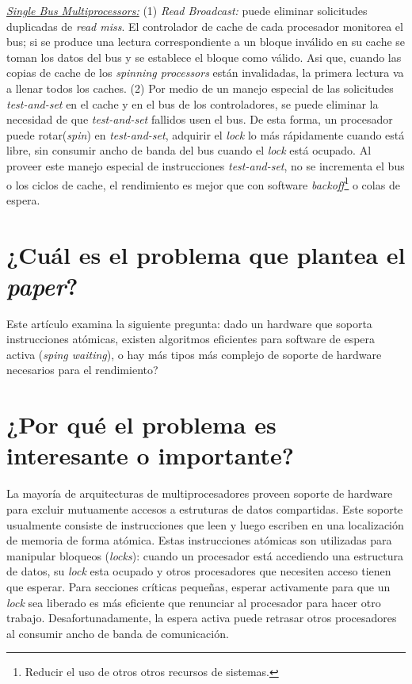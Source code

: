 \underline{\textit{Single Bus Multiprocessors:}} (1) \textit{Read Broadcast:} puede eliminar solicitudes duplicadas de \textit{read miss}. El controlador de cache de cada procesador monitorea el bus; si se produce una lectura correspondiente a un bloque inválido en su cache se toman los datos del bus y se establece el bloque como válido. Asi que, cuando las copias de cache de los \textit{spinning processors} están invalidadas, la primera lectura va a llenar todos los caches. (2) Por medio de un manejo especial de las solicitudes \textit{test-and-set} en el cache y en el bus de los controladores, se puede eliminar la necesidad de que \textit{test-and-set} fallidos usen el bus. De esta forma, un procesador puede rotar(\textit{spin}) en \textit{test-and-set}, adquirir el \textit{lock} lo más rápidamente cuando está libre, sin consumir ancho de banda del bus cuando el \textit{lock} está ocupado. Al proveer este manejo especial de instrucciones \textit{test-and-set}, no se incrementa el bus o los ciclos de cache, el rendimiento es mejor que con software \textit{backoff}\footnote{Reducir el uso de otros otros recursos de sistemas.} o colas de espera.  

\section{¿Cuál es el problema que plantea el \textit{paper}?}
Este artículo examina la siguiente pregunta: dado un hardware que soporta instrucciones atómicas, existen algoritmos eficientes para software de espera activa (\textit{sping waiting}), o hay más tipos más complejo de soporte de hardware necesarios para el rendimiento? 

\section{¿Por qué el problema es interesante o importante?}
La mayoría de arquitecturas de multiprocesadores proveen soporte de hardware para excluir mutuamente accesos a estruturas de datos compartidas. Este soporte usualmente consiste de instrucciones que leen y luego escriben en una localización de memoria de forma atómica. Estas instrucciones atómicas son utilizadas para manipular bloqueos (\textit{locks}): cuando un procesador está accediendo una estructura de datos, su \textit{lock} esta ocupado y otros procesadores que necesiten acceso tienen que esperar. Para secciones críticas pequeñas, esperar activamente para que un \textit{lock} sea liberado es más eficiente que renunciar al procesador para hacer otro trabajo. Desafortunadamente, la espera activa puede retrasar otros procesadores al consumir ancho de banda de comunicación. 

